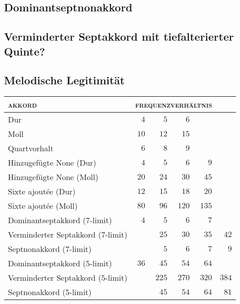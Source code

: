 \subsection{Dominantseptnonakkord}

\subsection{Verminderter Septakkord mit tiefalterierter Quinte?}

\subsection{Melodische Legitimität}

\begin{table}
  \centering
  \begin{tabular}{lrrrrr}
    \toprule
    \textsc{akkord} & \multicolumn{4}{l}{\textsc{frequenzverhältnis}}\\
    \midrule
    Dur                               & $4$  & $5$   & $6$                   \\
    Moll                              & $10$ & $12$  & $15$                  \\
    Quartvorhalt                      & $6$  & $8$   & $9$                   \\
    Hinzugefügte None (Dur)           & $4$  & $5$   & $6$    & $9$          \\
    Hinzugefügte None (Moll)          & $20$ & $24$  & $30$   & $45$         \\
    Sixte ajoutée (Dur)               & $12$ & $15$  & $18$   & $20$         \\
    Sixte ajoutée (Moll)              & $80$ & $96$  & $120$  & $135$        \\
    Dominantseptakkord (7-limit)      & $4$  & $5$   & $6$    & $7$          \\
    Verminderter Septakkord (7-limit) &      & $25$  & $30$   & $35$  & $42$ \\
    Septnonakkord (7-limit)           &      & $5$   & $6$    & $7$   & $9$  \\
    Dominantseptakkord (5-limit)      & $36$ & $45$  & $54$   & $64$         \\
    Verminderter Septakkord (5-limit) &      & $225$ & $270$  & $320$ & $384$\\
    Septnonakkord (5-limit)           &      & $45$  & $54$   & $64$  & $81$ \\
    \bottomrule
  \end{tabular}
\end{table}

